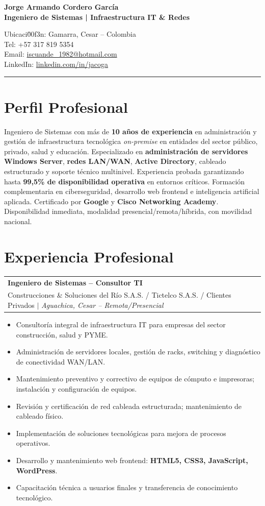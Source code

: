 \documentclass[10pt, letterpaper]{article}
\makeatletter
\newcommand{\cvheader}[6]{%
  \noindent
  \begin{minipage}[t]{0.62\linewidth}
    {\LARGE\bfseries\color{primary} #1}\\[4pt]
    {\large\color{accent}\bfseries #2}
  \end{minipage}%
  \hfill
  \begin{minipage}[t]{0.36\linewidth}
    \raggedleft
    {\small\color{darkgray}
      Ubicaci\u00f3n: #3\\[2pt]
      Tel: #4\\[2pt]
      Email: \href{mailto:#5}{#5}\\[2pt]
      LinkedIn: \href{https://linkedin.com/in/jacoga}{linkedin.com/in/jacoga}
    }
  \end{minipage}
  \vspace{4pt}
  \textcolor{rulecol}{\rule{\linewidth}{2pt}}
  \vspace{2pt}
}
\newcommand{\cventry}[5]{%
  \noindent
  \begin{tabularx}{\linewidth}{@{}X r@{}}
    {\bfseries\color{primary} #1} & \cellcolor{accentlight}{\small\color{accent}\bfseries #2} \\
    {\small\color{accent} #3} \textcolor{medgray}{$|$} {\small\color{darkgray}\itshape #4} & \\
  \end{tabularx}
  \vspace{2pt}
  #5
  \vspace{6pt}
}
\newcommand{\keyword}[1]{\textbf{#1}}
\makeatother
\begin{document}

\cvheader
  {Jorge Armando Cordero García}
  {Ingeniero de Sistemas | Infraestructura IT \& Redes}
  {Gamarra, Cesar – Colombia}
  {+57 317 819 5354}
  {iscuande\_1982@hotmail.com}
  {linkedin.com/in/jacoga}

\section{Perfil Profesional}

Ingeniero de Sistemas con más de \textbf{10 años de experiencia} en administración y gestión de infraestructura tecnológica \emph{on-premise} en entidades del sector público, privado, salud y educación. Especializado en \textbf{administración de servidores Windows Server}, \textbf{redes LAN/WAN}, \textbf{Active Directory}, cableado estructurado y soporte técnico multinivel. Experiencia probada garantizando hasta \textbf{99,5\% de disponibilidad operativa} en entornos críticos. Formación complementaria en ciberseguridad, desarrollo web frontend e inteligencia artificial aplicada. Certificado por \textbf{Google} y \textbf{Cisco Networking Academy}. Disponibilidad inmediata, modalidad presencial/remota/híbrida, con movilidad nacional.

\section{Experiencia Profesional}

\cventry
  {Ingeniero de Sistemas – Consultor TI}
  {Ene 2024 – Presente}
  {Construcciones \& Soluciones del Río S.A.S. / Tictelco S.A.S. / Clientes Privados}
  {Aguachica, Cesar – Remota/Presencial}
  {
    \begin{itemize}
      \item Consultoría integral de infraestructura IT para empresas del sector construcción, salud y PYME.
      \item Administración de servidores locales, gestión de racks, switching y diagnóstico de conectividad WAN/LAN.
      \item Mantenimiento preventivo y correctivo de equipos de cómputo e impresoras; instalación y configuración de equipos.
      \item Revisión y certificación de red cableada estructurada; mantenimiento de cableado físico.
      \item Implementación de soluciones tecnológicas para mejora de procesos operativos.
      \item Desarrollo y mantenimiento web frontend: \keyword{HTML5, CSS3, JavaScript, WordPress}.
      \item Capacitación técnica a usuarios finales y transferencia de conocimiento tecnológico.
    \end{itemize}
  }
\end{document}
